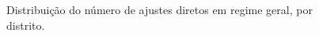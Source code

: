 \begin{figure}[H]
\begin{minipage}[t]{0.49\textwidth}
		\caption{Distribuição do número de ajustes diretos em regime geral, por distrito.}
		\label{fig:adloc}
	\end{minipage}
	
\end{figure}
\clearpage


%
%
%
%
